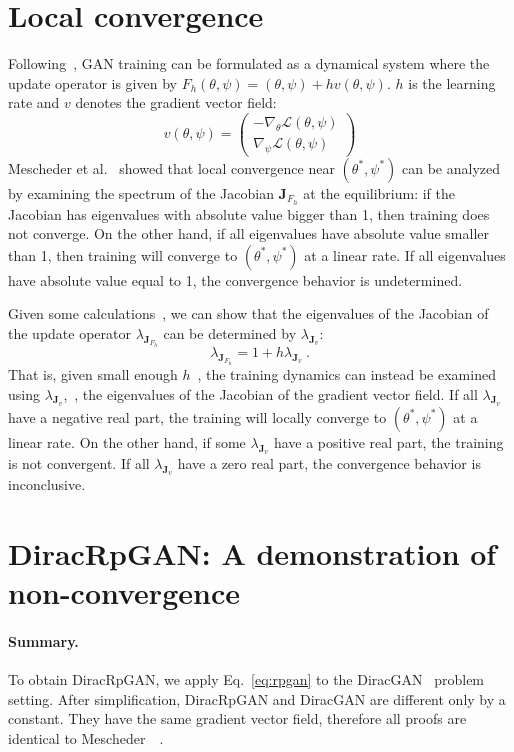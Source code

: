 \section{Local convergence}
Following~\cite{r1}, GAN training can be formulated as a dynamical system where the update operator is given by $F_h(\theta,\psi)=(\theta,\psi)+hv(\theta,\psi)$. $h$ is the learning rate and $v$ denotes the gradient vector field:
\begin{equation}
v(\theta,\psi)=\begin{pmatrix}
 -\nabla_\theta\mathcal{L}(\theta,\psi) \\
 \nabla_\psi\mathcal{L}(\theta,\psi)
\end{pmatrix}
\end{equation}
Mescheder et al.~\cite{gannum} showed that local convergence near $(\theta^*,\psi^*)$ can be analyzed by examining the spectrum of the Jacobian $\textbf{J}_{F_h}$ at the equilibrium: if the Jacobian has eigenvalues with absolute value bigger than 1, then training does not converge. On the other hand, if all eigenvalues have absolute value smaller than 1, then training will converge to $(\theta^*,\psi^*)$ at a linear rate. If all eigenvalues have absolute value equal to 1, the convergence behavior is undetermined.

Given some calculations~\cite{r1}, we can show that the eigenvalues of the Jacobian of the update operator $\lambda_{\textbf{J}_{F_h}}$ can be determined by $\lambda_{\textbf{J}_v}$:
\begin{equation}
\lambda_{\textbf{J}_{F_h}}=1+h\lambda_{\textbf{J}_v}\ .
\end{equation}
That is, given small enough $h$~\cite{r1}, the training dynamics can instead be examined using $\lambda_{\textbf{J}_v}$,~\ie, the eigenvalues of the Jacobian of the gradient vector field. If all $\lambda_{\textbf{J}_v}$ have a negative real part, the training will locally converge to $(\theta^*,\psi^*)$ at a linear rate. On the other hand, if some $\lambda_{\textbf{J}_v}$ have a positive real part, the training is not convergent. If all $\lambda_{\textbf{J}_v}$ have a zero real part, the convergence behavior is inconclusive.

\section{DiracRpGAN: A demonstration of non-convergence}
\paragraph{Summary.} To obtain DiracRpGAN, we apply Eq.~\ref{eq:rpgan} to the DiracGAN~\cite{r1} problem setting. After simplification, DiracRpGAN and DiracGAN are different only by a constant. They have the same gradient vector field, therefore all proofs are identical to Mescheder~\etal~\cite{r1}.

